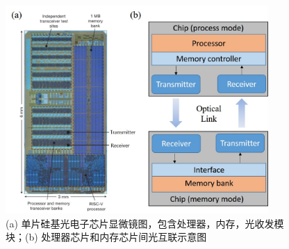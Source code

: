 \begin{figure}[htb]
	\centering
	\includegraphics[width=10cm]{./Pictures/figure3.jpg}
	\caption{ (a) 单片硅基光电子芯片显微镜图，包含处理器，内存，光收发模块\cite{sun2015single}；(b) 处理器芯片和内存芯片间光互联示意图}
	\label{figure3}
\end{figure}

